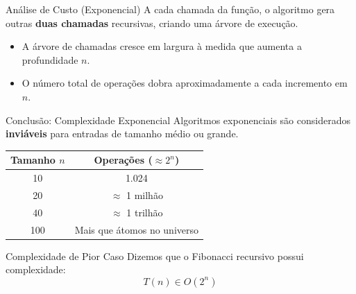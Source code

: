 \documentclass[9pt]{beamer}
\begin{document}
\begin{frame}{Análise de Custo (Exponencial)}
    A cada chamada da função, o algoritmo gera outras \textbf{duas chamadas} recursivas, criando uma árvore de execução.
    \vspace{0.2cm}
    \begin{center}
    \end{center}
    \vspace{0.2cm}
    \begin{itemize}
        \item A árvore de chamadas cresce em largura à medida que aumenta a profundidade $n$.
        \item O número total de operações dobra aproximadamente a cada incremento em $n$.
    \end{itemize}
\end{frame}

\begin{frame}{Conclusão: Complexidade Exponencial}
    Algoritmos exponenciais são considerados \textbf{inviáveis} para entradas de tamanho médio ou grande.
    \vspace{0.4cm}
    \begin{table}
        \centering
        \small
        \begin{tabular}{c|c}
            \hline
            \textbf{Tamanho $n$} & \textbf{Operações ($\approx 2^n$)} \\
            \hline
            10 & 1.024 \\
            20 & $\approx$ 1 milhão \\
            40 & $\approx$ 1 trilhão \\
            100 & Mais que átomos no universo \\
            \hline
        \end{tabular}
    \end{table}
    \vspace{0.4cm}
    \begin{alertblock}{Complexidade de Pior Caso}
        Dizemos que o Fibonacci recursivo possui complexidade:
        \[ T(n) \in O(2^n) \]
    \end{alertblock}
\end{frame}
\end{document}
